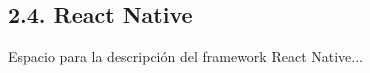\subsection{2.4. React Native}\label{sec:react_native}

Espacio para la descripción del framework React Native...

